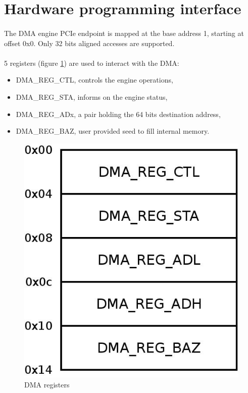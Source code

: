 \documentclass[a4paper, 11pt]{article}
\begin{document}
\newpage
\section{Hardware programming interface}
\paragraph{}
The DMA engine PCIe endpoint is mapped at the base address 1, starting at
offset 0x0. Only 32 bits aligned accesses are supported.
\paragraph{}
5 registers (figure \ref{dma_regs}) are used to interact with the DMA:
\begin{itemize}
\item DMA\_REG\_CTL, controls the engine operations,
\item DMA\_REG\_STA, informs on the engine status,
\item DMA\_REG\_ADx, a pair holding the 64 bits destination address,
\item DMA\_REG\_BAZ, user provided seed to fill internal memory.
\end{itemize}

\begin{figure}[!h]
\begin{center}
\includegraphics[scale=0.20]{../pic/dma_regs/main.jpeg}
\end{center}
\caption{\tiny{DMA registers}}
\label{dma_regs}
\end{figure}
\end{document}

